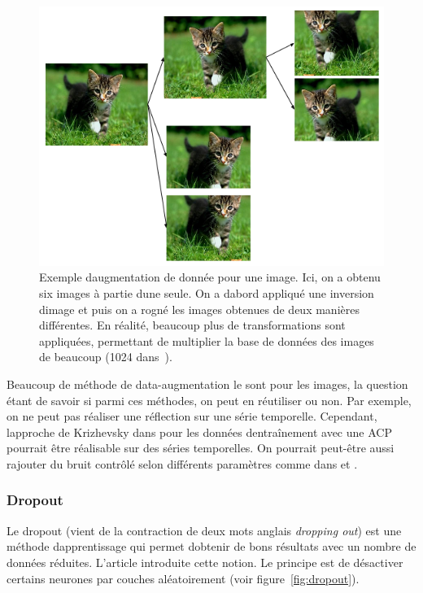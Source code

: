 \documentclass[11pt]{sdm}
\begin{document}
			\begin{figure}[!ht]
				\centering
				\includegraphics[scale=0.6,natwidth=528,natheight=397]{figures/dataAugmentationImage.png}
				\caption{Exemple d\textquotesingle augmentation de donn\'ee pour une image. Ici, on a obtenu six images \`a partie d\textquotesingle une seule. On a d\textquotesingle abord appliqu\'e une inversion d\textquotesingle image et puis on a rogn\'e les images obtenues de deux mani\`eres diff\'erentes. En r\'ealit\'e, beaucoup plus de transformations sont appliqu\'ees, permettant de multiplier la base de donn\'ees des images de beaucoup (1024 dans~\cite{howard2013some}).}
				\label{fig:dataAugmentationChat}
			\end{figure}

			Beaucoup de m\'ethode de data-augmentation le sont pour les images, la question \'etant de savoir si parmi ces m\'ethodes, on peut en r\'eutiliser ou non. Par exemple, on ne peut pas r\'ealiser une r\'eflection sur une s\'erie temporelle. Cependant, l\textquotesingle approche de Krizhevsky dans \cite{krizhevsky2012imagenet} pour les donn\'ees d\textquotesingle entra\^inement avec une ACP pourrait \^etre r\'ealisable sur des s\'eries temporelles. On pourrait peut-\^etre aussi rajouter du bruit contr\^ol\'e selon diff\'erents param\`etres comme dans \cite{krizhevsky2012imagenet} et \cite{howard2013some}.

		\subsubsection{Dropout}
			Le dropout (vient de la contraction de deux mots anglais \textit{dropping out}) est une m\'ethode d\textquotesingle apprentissage qui permet d\textquotesingle obtenir de bons r\'esultats avec un nombre de donn\'ees r\'eduites. L'article \cite{srivastava2014dropout} introduite cette notion. Le principe est de d\'esactiver certains neurones par couches al\'eatoirement (voir figure~\ref{fig:dropout}).
\end{document}
